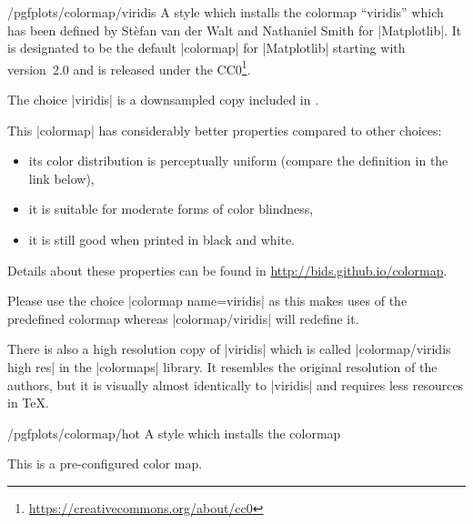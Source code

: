 \begin{stylekey}{/pgfplots/colormap/viridis}
    A style which installs the colormap ``viridis'' which has been defined by
    Stèfan van der Walt and Nathaniel Smith for |Matplotlib|. It is
    designated to be the default |colormap| for |Matplotlib| starting with
    version~2.0 and is released under the
    CC0\footnote{\url{https://creativecommons.org/about/cc0}}.

    The choice |viridis| is a downsampled copy included in \PGFPlots{}.

\begin{codeexample}
\pgfplotsset{
    colormap name=viridis,
}
\end{codeexample}

    This |colormap| has considerably better properties compared to other choices:
    \begin{itemize}
        \item its color distribution is perceptually uniform (compare the
            definition in the link below),
        \item it is suitable for moderate forms of color blindness,
        \item it is still good when printed in black and white.
    \end{itemize}
    Details about these properties can be found in
    \url{http://bids.github.io/colormap}.

    Please use the choice |colormap name=viridis| as this makes uses of the
    predefined colormap whereas |colormap/viridis| will redefine it.

    There is also a high resolution copy of |viridis| which is called
    |colormap/viridis high res| in the |colormaps| library. It resembles the
    original resolution of the authors, but it is visually almost identically
    to |viridis| and requires less resources in \TeX{}.
\end{stylekey}

\begin{stylekey}{/pgfplots/colormap/hot}
    A style which installs the colormap
\begin{codeexample}
\end{codeexample}


    This is a pre-configured color map.
\end{stylekey}

